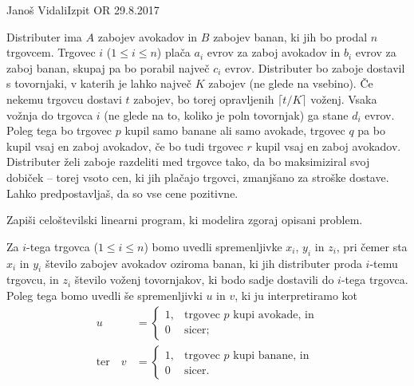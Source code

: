 \begin{naloga}{Janoš Vidali}{Izpit OR 29.8.2017}
\begin{vprasanje}
Distributer ima $A$ zabojev avokadov in $B$ zabojev banan,
ki jih bo prodal $n$ trgovcem.
Trgovec $i$ ($1 \le i \le n$)
plača $a_i$ evrov za zaboj avokadov in $b_i$ evrov za zaboj banan,
skupaj pa bo porabil največ $c_i$ evrov.
Distributer bo zaboje dostavil s tovornjaki,
v katerih je lahko največ $K$ zabojev (ne glede na vsebino).
Če nekemu trgovcu dostavi $t$ zabojev,
bo torej opravljenih $\lceil t/K \rceil$ voženj.
Vsaka vožnja do trgovca $i$ (ne glede na to, koliko je poln tovornjak)
ga stane $d_i$ evrov.
Poleg tega bo trgovec $p$ kupil samo banane ali samo avokade,
trgovec $q$ pa bo kupil vsaj en zaboj avokadov,
če bo tudi trgovec $r$ kupil vsaj en zaboj avokadov.
Distributer želi zaboje razdeliti med trgovce tako,
da bo maksimiziral svoj dobiček
-- torej vsoto cen, ki jih plačajo trgovci,
zmanjšano za stroške dostave.
Lahko predpostavljaš, da so vse cene pozitivne.

Zapiši celoštevilski linearni program, ki modelira zgoraj opisani problem.
\end{vprasanje}

\begin{odgovor}
Za $i$-tega trgovca ($1 \le i \le n$)
bomo uvedli spremenljivke $x_i$, $y_i$ in $z_i$,
pri čemer sta $x_i$ in $y_i$ število zabojev avokadov oziroma banan,
ki jih distributer proda $i$-temu trgovcu,
in $z_i$ število voženj tovornjakov,
ki bodo sadje dostavili do $i$-tega trgovca.
Poleg tega bomo uvedli še spremenljivki $u$ in $v$,
ki ju interpretiramo kot
\begin{align*}
u &= \begin{cases}
1, & \text{trgovec $p$ kupi avokade, in} \\
0  & \text{sicer;}
\end{cases} \\
\text{ter} \quad
v &= \begin{cases}
1, & \text{trgovec $p$ kupi banane, in} \\
0  & \text{sicer.}
\end{cases}
\end{align*}


\end{odgovor}
\end{naloga}
